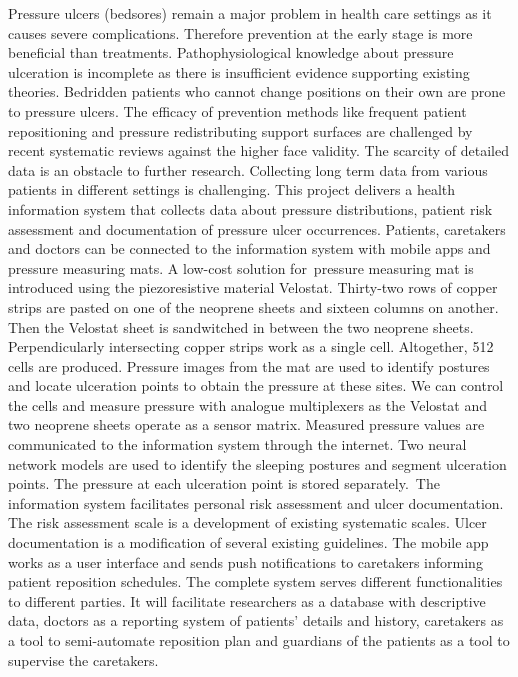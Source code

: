 Pressure ulcers (bedsores) remain a major problem in health care settings as it causes severe complications. Therefore prevention at the early stage is more beneficial than treatments. Pathophysiological knowledge about pressure ulceration is incomplete as there is insufficient evidence supporting existing theories. Bedridden patients who cannot change positions on their own are prone to pressure ulcers. The efficacy of prevention methods like frequent patient repositioning and pressure redistributing support surfaces are challenged by recent systematic reviews against the higher face validity. The scarcity of detailed data is an obstacle to further research. Collecting long term data from various patients in different settings is challenging. This project delivers a health information system that collects data about pressure distributions, patient risk assessment and documentation of pressure ulcer occurrences. Patients, caretakers and doctors can be connected to the information system with mobile apps and pressure measuring mats. A low-cost solution for pressure measuring mat is introduced using the piezoresistive material Velostat. Thirty-two rows of copper strips are pasted on one of the neoprene sheets and sixteen columns on another. Then the Velostat sheet is sandwitched in between the two neoprene sheets. Perpendicularly intersecting copper strips work as a single cell. Altogether, 512 cells are produced. Pressure images from the mat are used to identify postures and locate ulceration points to obtain the pressure at these sites. We can control the cells and measure pressure with analogue multiplexers as the Velostat and two neoprene sheets operate as a sensor matrix. Measured pressure values are communicated to the information system through the internet. Two neural network models are used to identify the sleeping postures and segment ulceration points. The pressure at each ulceration point is stored separately. The information system facilitates personal risk assessment and ulcer documentation. The risk assessment scale is a development of existing systematic scales. Ulcer documentation is a modification of several existing guidelines. The mobile app works as a user interface and sends push notifications to caretakers informing patient reposition schedules. The complete system serves different functionalities to different parties. It will facilitate researchers as a database with descriptive data, doctors as a reporting system of patients' details and history, caretakers as a tool to semi-automate reposition plan and guardians of the patients as a tool to supervise the caretakers. 